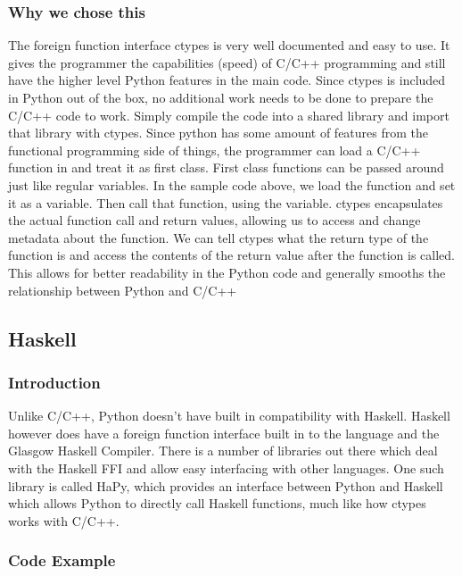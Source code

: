 \documentclass[12pt]{article}
\begin{document}
        \subsubsection{Why we chose this}
            The foreign function interface ctypes is very well documented and easy to use.
            It gives the programmer the capabilities (speed) of C/C++ programming
            and still have the higher level Python features in the main code. Since ctypes
            is included in Python out of the box, no additional work needs to be done to prepare
            the C/C++ code to work. Simply compile the code into a shared library and import that
            library with ctypes. Since python has some amount of features from the functional
            programming side of things, the programmer can load a C/C++ function in and treat it
            as first class. First class functions can be passed around just like regular variables.
            In the sample code above, we load the function and set it as a variable. Then call that
            function, using the variable. ctypes encapsulates the actual function call and return
            values, allowing us to access and change metadata about the function. We can tell ctypes
            what the return type of the function is and access the contents of the return value after
            the function is called. This allows for better readability in the Python code and
            generally smooths the relationship between Python and C/C++
            
    \subsection{Haskell}
        \subsubsection{Introduction}
            Unlike C/C++, Python doesn't have built in compatibility with Haskell. Haskell however
            does have a foreign function interface built in to the language and the Glasgow Haskell
            Compiler. There is a number of libraries out there which deal with the Haskell FFI and
            allow easy interfacing with other languages. One such library is called HaPy, which
            provides an interface between Python and Haskell which allows Python to directly call
            Haskell functions, much like how ctypes works with C/C++.
        \subsubsection{Code Example}
            
            
            
\end{document}
